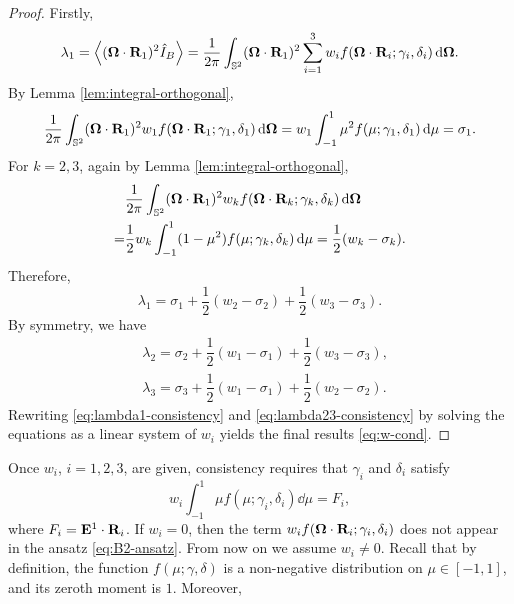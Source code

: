 \begin{proof}
  Firstly, 
  \[
  \lambda_1 = \left\langle (\boldsymbol{\Omega}\cdot\mathbf{R}_1)^2 \hat I_B \right\rangle = \dfrac1{2\pi}
  \int_{\mathbb{S}^2} (\boldsymbol{\Omega}\cdot\mathbf{R}_1)^2 \sum\limits_{i = 1}^3 w_i 
  f(\boldsymbol{\Omega}\cdot\mathbf{R}_i; \gamma_i, \delta_i) \,{\rm d}\boldsymbol{\Omega}.
  \]
  By Lemma \ref{lem:integral-orthogonal},
  \[
    \dfrac1{2\pi} \int_{\mathbb{S}^2} (\boldsymbol{\Omega}\cdot\mathbf{R}_1)^2 w_1 
    f(\boldsymbol{\Omega}\cdot\mathbf{R}_1; \gamma_1, \delta_1) \,{\rm d}\boldsymbol{\Omega} 
    = w_1 \int_{-1}^1 \mu^2 f(\mu; \gamma_1, 
    \delta_1) \,{\rm d}\mu 
    = \sigma_1.
  \]
  For $k = 2,3$, again by Lemma \ref{lem:integral-orthogonal},
  \[
    \begin{split}
      & \dfrac1{2\pi} \int_{\mathbb{S}^2} (\boldsymbol{\Omega}\cdot\mathbf{R}_1)^2 w_k
      f(\boldsymbol{\Omega}\cdot\mathbf{R}_k; \gamma_k, \delta_k) \,{\rm d}\boldsymbol{\Omega}  \\
      = & \dfrac12 w_k \int_{-1}^1 (1-\mu^2) f(\mu; \gamma_k,
      \delta_k) \,{\rm d}\mu 
      = \dfrac12 (w_k - \sigma_k).
    \end{split}
  \]
  Therefore, 
  \begin{equation}\label{eq:lambda1-consistency}
    \lambda_1 = \sigma_1 + \dfrac12 (w_2 - \sigma_2) + 
    \dfrac12 (w_3 - \sigma_3).
  \end{equation}
  By symmetry, we have
  \begin{equation}\label{eq:lambda23-consistency}
    \begin{split}
      & \lambda_2 = \sigma_2 + \dfrac12 (w_1 - \sigma_1) + 
      \dfrac12 (w_3 - \sigma_3), \\
      & \lambda_3 = \sigma_3 + \dfrac12 (w_1 - \sigma_1) + 
      \dfrac12 (w_2 - \sigma_2).
    \end{split}
  \end{equation}
  Rewriting \eqref{eq:lambda1-consistency} and
  \eqref{eq:lambda23-consistency} by solving the equations as a linear
  system of $w_i$ yields the final results \eqref{eq:w-cond}.
\end{proof}
Once $w_i$, $i=1,2,3$, are given, consistency
requires that $\gamma_i$ and $\delta_i$ satisfy
\begin{equation}\label{eq:moment-problem-1D}
  w_i \int_{-1}^1 \mu f(\mu;\gamma_i,\delta_i)
  \dd\mu = F_i,
\end{equation}
where $F_i = \mathbf{E}^1\cdot\mathbf{R}_i$. If $w_i = 0$, then the term $w_i 
f(\boldsymbol{\Omega} \cdot \mathbf{R}_i; \gamma_i, \delta_i)$
does not appear in the ansatz \eqref{eq:B2-ansatz}. From now on we
assume $w_i \not= 0$. Recall that by definition, the function $f(\mu; \gamma, \delta)$ 
is a non-negative distribution on $\mu \in [-1,1]$, and its zeroth moment is $1$. Moreover,
